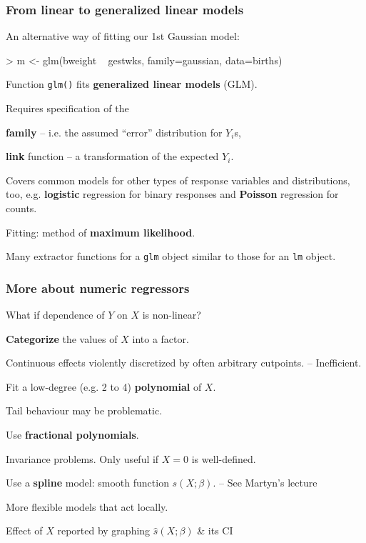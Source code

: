 \documentclass[12pt,dvipsnames,t,handout%
,aspectratio=169%
]{beamer}
\begin{document}
\begin{frame}[fragile]
\frametitle{From linear to generalized linear models}

\bi
\item An alternative way of fitting our 1st Gaussian model:
\medskip
{\small
\begin{semiverbatim}
> m <- glm(bweight ~ gestwks, family=gaussian, data=births)
\end{semiverbatim}
}
\medskip
\item
Function \texttt{glm()} fits {\bf generalized linear models} (GLM).
\medskip
\item
Requires specification of the  
\bi
{\normalsize
\item[--] {\bf family} 
-- i.e. the assumed ``error'' distribution for $Y_i$s, %
\item[--]
{\bf link} function -- a transformation of the expected $Y_i$.
}
\ei
\item
Covers common models for other types
of response variables and distributions, too, e.g.
{\bf logistic} regression for binary responses and {\bf Poisson} regression
for counts.
\medskip
\item
Fitting: method of {\bf maximum likelihood}.  
\item
Many extractor functions
for a {\tt glm} object similar to those 
 for an {\tt lm} object.

\ei

\end{frame}


\begin{frame}[fragile]\frametitle{More about numeric regressors}

What if dependence of $Y$ on $X$ is non-linear?

\begin{itemize}
\item {\bf Categorize} the values of $X$ into a factor.

\bi
{%
\item[--] Continuous effects violently discretized 
  by often arbitrary cutpoints. -- Inefficient.
}
\ei
\item Fit a low-degree (e.g. 2 to 4) {\bf polynomial} of $X$.
\bi
{%
\item[--] Tail behaviour may be problematic. 
}
\ei
\item Use {\bf fractional polynomials}.
\bi
{%
\item[--] Invariance problems. Only useful if $X = 0$ is well-defined.
}
\ei
\item Use a {\bf spline} model: smooth function $s(X;\beta)$. -- See Martyn's lecture
\bi
{%
\item[--] More flexible models that act locally.
\item[--] Effect of $X$ reported by graphing $\widehat s(X;\beta)$ \& its CI
}
\ei
\end{itemize}
 
\end{frame}
\end{document}

